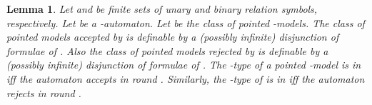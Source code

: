 \documentclass[copyright,creativecommons]{eptcs}
\newtheorem{lemma}[theorem]{Lemma}
\begin{document}
\begin{lemma}\label{firstlemma}
Let  and  be finite sets of unary and binary relation symbols,
respectively. Let  be a -automaton.
Let  be the class of pointed -models.
The class  of pointed models accepted by  is definable
by a (possibly infinite)
disjunction  of formulae of . Also the 
class  of pointed models rejected by  is definable
by a (possibly infinite)
disjunction  of formulae of .
The -type of a pointed -model  is in  iff
the automaton  accepts  in round . Similarly, the -type of 
is in  iff the automaton  rejects  in round .
\begin{comment}
If  specifies a local algorithm in some class  and
  is the class of pointed models accepted by  in ,
then there is a formula of  that defines 
with respect to .
\end{comment}
\end{lemma}
\end{document}

